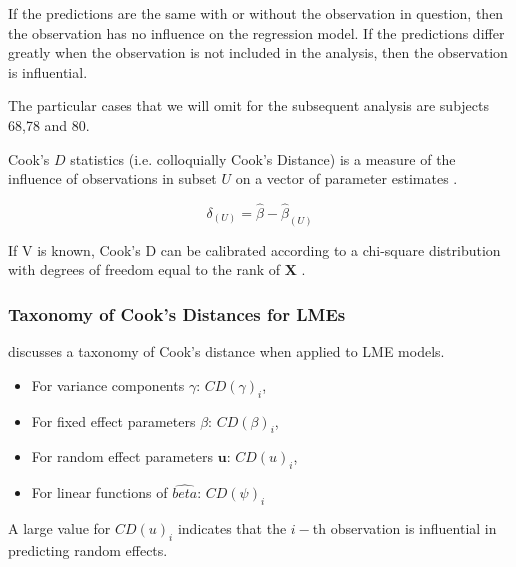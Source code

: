 \documentclass[12pt, a4paper]{report}
\theoremstyle{plain}
\theoremstyle{definition}
\theoremstyle{remark}
\begin{document}
	If the predictions are the same with or without the observation in question, then the observation has no influence on the regression model. If the predictions differ greatly when the observation is not included in the analysis, then the observation is influential.
	
	The particular cases that we will omit for the subsequent analysis are subjects 68,78 and 80.
	
	
	
	
	 Cook's $D$ statistics (i.e. colloquially Cook's Distance) is a measure of the influence of observations in subset $U$ on a vector of parameter estimates \citep{cook77}.
	
	\[ \delta_{(U)} = \hat{\beta} - \hat{\beta}_{(U)}\]
	
	If V is known, Cook's D can be calibrated according to a chi-square distribution with degrees of freedom equal to the rank of $\boldsymbol{X}$ \citep{cpj92}.
	


\subsubsection{Taxonomy of Cook's Distances for LMEs}
	\citet{Zewotir} discusses a taxonomy of Cook's distance when applied to LME models. \begin{itemize}
		\item For variance components $\gamma$: $CD(\gamma)_i$,
		\item For fixed effect parameters $\beta$: $CD(\beta)_i$,
		\item For random effect parameters $\boldsymbol{u}$: $CD(u)_i$,
		\item For linear functions of $\hat{beta}$: $CD(\psi)_i$
	\end{itemize}			
	

	
A large value for $CD(u)_i$ indicates that the $i-$th observation is influential in predicting random effects.
	
\end{document}
